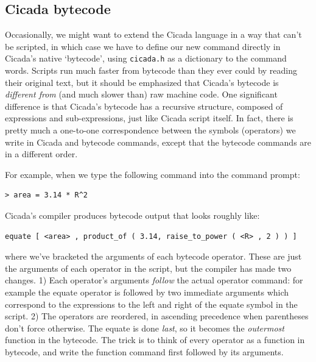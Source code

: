 \documentclass{article}
\newenvironment{code}{
       \begin{list}{}{
               \setlength{\leftmargin}{.4in}
               \setlength{\rightmargin}{0in}
               \setlength{\topsep}{.2in}
       }
       \small
       \item[] }
       { \end{list}   }
\begin{document}

\subsection{Cicada bytecode}

Occasionally, we might want to extend the Cicada language in a way that can't be scripted, in which case we have to define our new command directly in Cicada's native `bytecode', using \verb#cicada.h# as a dictionary to the command words.  Scripts run much faster from bytecode than they ever could by reading their original text, but it should be emphasized that Cicada's bytecode is \emph{different from} (and much slower than) raw machine code.  One significant difference is that Cicada's bytecode has a recursive structure, composed of expressions and sub-expressions, just like Cicada script itself.  In fact, there is pretty much a one-to-one correspondence between the symbols (operators) we write in Cicada and bytecode commands, except that the bytecode commands are in a different order.

For example, when we type the following command into the command prompt:

\begin{code} \begin{verbatim}
> area = 3.14 * R^2
\end{verbatim} \end{code}

\noindent Cicada's compiler produces bytecode output that looks roughly like:

\begin{code} \begin{verbatim}
equate [ <area> , product_of ( 3.14, raise_to_power ( <R> , 2 ) ) ]
\end{verbatim} \end{code}

\noindent where we've bracketed the arguments of each bytecode operator.  These are just the arguments of each operator in the script, but the compiler has made two changes.  1) Each operator's arguments \emph{follow} the actual operator command:  for example the equate operator is followed by two immediate arguments which correspond to the expressions to the left and right of the equate symbol in the script.  2) The operators are reordered, in ascending precedence when parentheses don't force otherwise.  The equate is done \emph{last}, so it becomes the \emph{outermost} function in the bytecode.  The trick is to think of every operator as a function in bytecode, and write the function command first followed by its arguments.
\end{document}
